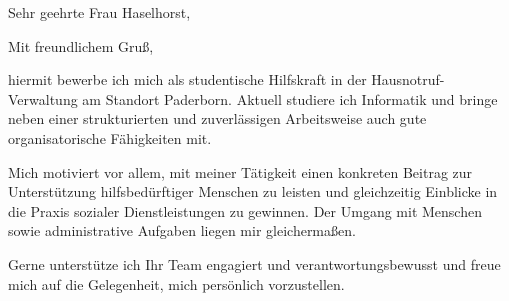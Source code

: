 \documentclass[10pt,a4paper,sans]{moderncv}        %
\begin{document}
\date{\today}
\opening{Sehr geehrte Frau Haselhorst,}
\closing{Mit freundlichem Gruß,}
\makelettertitle

hiermit bewerbe ich mich als studentische Hilfskraft in der Hausnotruf-Verwaltung am Standort Paderborn. 
Aktuell studiere ich Informatik und bringe neben einer strukturierten und zuverlässigen Arbeitsweise 
auch gute organisatorische Fähigkeiten mit.

Mich motiviert vor allem, mit meiner Tätigkeit einen konkreten Beitrag zur Unterstützung 
hilfsbedürftiger Menschen zu leisten und gleichzeitig Einblicke in die Praxis sozialer Dienstleistungen 
zu gewinnen. Der Umgang mit Menschen sowie administrative Aufgaben liegen mir gleichermaßen.

Gerne unterstütze ich Ihr Team engagiert und verantwortungsbewusst und freue mich auf
 die Gelegenheit, mich persönlich vorzustellen.

\makeletterclosing

\clearpage

\makecvtitle

\end{document}
